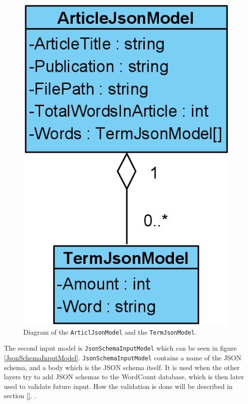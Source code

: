 \begin{figure}[H]
    \centering
    \includegraphics[scale=0.5]{Images/jsonArticleModel.PNG}
    \caption{Diagram of the \texttt{ArticlJsonModel} and the \texttt{TermJsonModel}.}
    \label{ArticlJsonModel}
\end{figure}

The second input model is \texttt{JsonSchemaInputModel} which can be seen in figure \ref*{JsonSchemaInputModel}. \texttt{JsonSchemaInputModel} contains a name of the JSON schema, and a body which is the JSON schema itself. 
It is used when the other layers try to add JSON schemas to the WordCount database, which is then later used to validate future input. 
How the validation is done will be described in section \ref*{}. .

